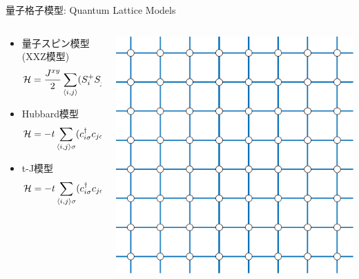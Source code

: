 \begin{frame}{量子格子模型: Quantum Lattice Models}
  \begin{columns}[T]
    \begin{column}{.8\textwidth}
      \begin{itemize}
      \item 量子スピン模型(XXZ模型) \begin{equation*} {\cal H} = \frac{J^{xy}}{2}
        \sum_{\langle i,j \rangle} (S^+_i S^-_j + S^-_i S^+_j) + J^z
        \sum_{\langle i,j \rangle} S^z_i S^z_j \end{equation*}
      \item Hubbard模型 \begin{equation*} {\cal H} = -t \sum_{\langle i,j \rangle \sigma}
        (c^\dagger_{i\sigma} c_{j\sigma} + \mbox{h.c.}) + U \sum_{i}
        n_{i\uparrow} n_{i\downarrow} \end{equation*}
      \item t-J模型 \begin{equation*} {\cal H} = -t \sum_{\langle i,j \rangle \sigma}
        (c^\dagger_{i\sigma} c_{j\sigma} + \mbox{h.c.}) + J \sum_{i,j}
        ({\bf S}_i \cdot {\bf S}_j - n_{i} n_{j} / 4) \end{equation*}
      \end{itemize}
    \end{column}
    \begin{column}{.2\textwidth}
      \includegraphics[width=\textwidth]{square.pdf}
    \end{column}
  \end{columns}
\end{frame}

